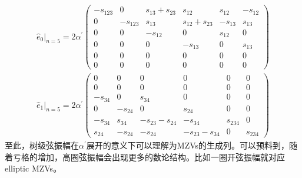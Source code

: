\begin{equation}
	\begin{gathered}
		\hat{e}_0|_{n=5} = 2\alpha^{\prime}
		\begin{pmatrix} 
			-s_{123} & 0 & s_{13}+s_{23} & s_{12} & s_{12} & -s_{12} \\
			0 & -s_{123} & s_{13} & s_{12}+s_{23} & -s_{13} & s_{13} \\
			0 & 0 & -s_{12} & 0 & s_{12} & 0 \\
			0 & 0 & 0 & -s_{13} & 0 & s_{13} \\
			0 & 0 & 0 & 0 & 0 & 0 \\
			0 & 0 & 0 & 0 & 0 & 0
		\end{pmatrix} \\
		\hat{e}_1|_{n=5} = 2\alpha^{\prime}
		\begin{pmatrix} 
			0 & 0 & 0 & 0 & 0 & 0 \\
			0 & 0 & 0 & 0 & 0 & 0 \\
			-s_{34} & 0 & s_{34} & 0 & 0 & 0 \\
			0 & -s_{24} & 0 & s_{24} & 0 & 0 \\
			-s_{34} & s_{34} & -s_{23}-s_{24} & -s_{34} & s_{234} & 0 \\
			s_{24} & -s_{24} & -s_{24} & -s_{23}-s_{34} & 0 & s_{234}
		\end{pmatrix}
	\end{gathered}
\end{equation}
至此，树级弦振幅在$\alpha^\prime$展开的意义下可以理解为MZVs的生成列。可以预料到，随着亏格的增加，高圈弦振幅会出现更多的数论结构。比如一圈开弦振幅就对应elliptic MZVs\cite{Broedel:2014vla}。

